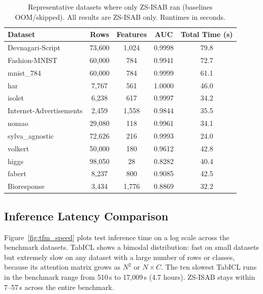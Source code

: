 \documentclass{article}
\begin{document}
\begin{table}[htbp]
\centering
\caption{Representative datasets where only ZS-ISAB ran (baselines OOM/skipped). All results are ZS-ISAB only. Runtimes in seconds.}
\label{tab:oom_datasets}
\small
\begin{tabular}{@{}lcccc@{}}
\toprule
\textbf{Dataset} & \textbf{Rows} & \textbf{Features} & \textbf{AUC} & \textbf{Total Time (s)} \\
\midrule
Devnagari-Script  & 73,600 & 1,024 & 0.9998 & 79.8 \\
Fashion-MNIST     & 60,000 & 784   & 0.9941 & 72.7 \\
mnist\_784        & 60,000 & 784   & 0.9999 & 61.1 \\
har               & 7,767  & 561   & 1.0000 & 46.0 \\
isolet            & 6,238  & 617   & 0.9997 & 34.2 \\
Internet-Advertisements & 2,459 & 1,558 & 0.9844 & 35.5 \\
nomao             & 29,080 & 118   & 0.9961 & 34.1 \\
sylva\_agnostic   & 72,626 & 216   & 0.9993 & 24.0 \\
volkert           & 50,000 & 180   & 0.9612 & 42.8 \\
higgs             & 98,050 & 28    & 0.8282 & 40.4 \\
fabert            & 8,237  & 800   & 0.9085 & 42.5 \\
Bioresponse       & 3,434  & 1,776 & 0.8869 & 32.2 \\
\bottomrule
\end{tabular}
\end{table}

\subsection{Inference Latency Comparison}

Figure~\ref{fig:tfm_speed} plots test inference time on a log scale across the benchmark datasets. TabICL shows a bimodal distribution: fast on small datasets but extremely slow on any dataset with a large number of rows or classes, because its attention matrix grows as $N^2$ or $N \times C$. The ten slowest TabICL runs in the benchmark range from 510\,s to 17{,}009\,s (4.7 hours). ZS-ISAB stays within 7--57\,s across the entire benchmark.
\end{document}
